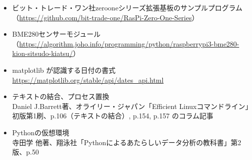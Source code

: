 \documentclass[12pt,a4paper,uplatex]{jsarticle}
\begin{document}
\begin{itemize}
	\item ビット・トレード・ワン社zerooneシリーズ拡張基板のサンプルプログラム\\
	（\url{https://github.com/bit-trade-one/RasPi-Zero-One-Series}）
	\item BME280センサーモジュール\\
	（\url{https://algorithm.joho.info/programming/python/raspberrypi3-bme280-kion-sitsudo-kiatsu/}）
	\item matplotlib が認識する日付の書式\\
	\url{https://matplotlib.org/stable/api/dates_api.html}
	\item テキストの結合、プロセス置換\\
	Daniel J.Barrett著、オライリー・ジャパン「Efficient Linuxコマンドライン」初版第1刷、p.106（テキストの結合）, p.154, p.157 のコラム記事
	\item Pythonの仮想環境\\
	寺田学 他著、翔泳社「Pythonによるあたらしいデータ分析の教科書」第2版、p.50
\end{itemize}
\end{document}
